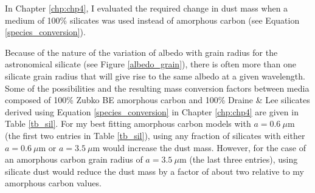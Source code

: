 In Chapter \ref{chp:chp4}, I evaluated the required change in dust mass when a medium of 100\% 
silicates was used instead of amorphous carbon (see Equation \ref{species_conversion}). 
%

Because of the nature of the variation of albedo with grain radius for the 
\citet{Draine1984} astronomical silicate (see Figure \ref{albedo_grain}), 
there is often more than one silicate grain radius that will give rise to 
the same albedo at a given wavelength.  Some of the possibilities and the 
resulting mass conversion factors between media composed of 100\% Zubko BE amorphous carbon and 100\% Draine \& Lee silicates derived using Equation \ref{species_conversion} in Chapter \ref{chp:chp4} are given in Table \ref{tb_sil}.  For 
my best fitting amorphous carbon models with $a=0.6~\mu$m (the first two 
entries in Table \ref{tb_sil}), using any fraction of silicates with 
either $a=0.6~\mu$m or $a=3.5~\mu$m would increase the dust mass.  
However, 
for the case of an amorphous carbon grain radius of $a=3.5~\mu$m (the last 
three entries), using silicate dust would reduce the dust mass by a factor 
of about two relative to my amorphous carbon values.

